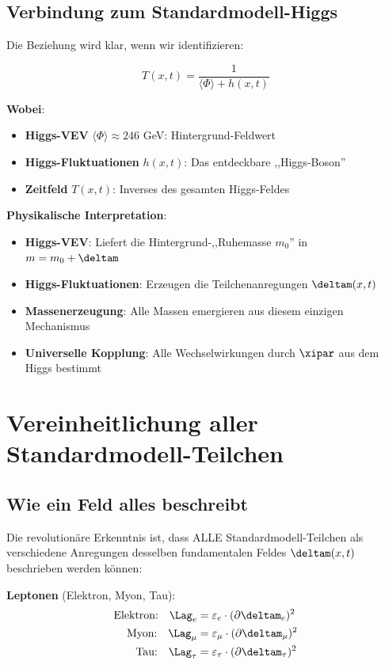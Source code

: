 	\subsection{Verbindung zum Standardmodell-Higgs}
	
	Die Beziehung wird klar, wenn wir identifizieren:
	
	\begin{equation}
		T(x,t) = \frac{1}{\langle\Phi\rangle + h(x,t)}
	\end{equation}
	
	\textbf{Wobei}:
	\begin{itemize}
		\item \textbf{Higgs-VEV} $\langle\Phi\rangle \approx 246$ GeV: Hintergrund-Feldwert
		\item \textbf{Higgs-Fluktuationen} $h(x,t)$: Das entdeckbare ,,Higgs-Boson''
		\item \textbf{Zeitfeld} $T(x,t)$: Inverses des gesamten Higgs-Feldes
	\end{itemize}
	
	\textbf{Physikalische Interpretation}:
	\begin{itemize}
		\item \textbf{Higgs-VEV}: Liefert die Hintergrund-,,Ruhemasse $m_0$'' in $m = m_0 + \deltam$
		\item \textbf{Higgs-Fluktuationen}: Erzeugen die Teilchenanregungen $\deltam(x,t)$
		\item \textbf{Massenerzeugung}: Alle Massen emergieren aus diesem einzigen Mechanismus
		\item \textbf{Universelle Kopplung}: Alle Wechselwirkungen durch $\xipar$ aus dem Higgs bestimmt
	\end{itemize}
	
	\section{Vereinheitlichung aller Standardmodell-Teilchen}
	
	\subsection{Wie ein Feld alles beschreibt}
	
	Die revolutionäre Erkenntnis ist, dass ALLE Standardmodell-Teilchen als verschiedene Anregungen desselben fundamentalen Feldes $\deltam(x,t)$ beschrieben werden können:
	
	\textbf{Leptonen} (Elektron, Myon, Tau):
	\begin{align}
		\text{Elektron:} \quad \Lag_e &= \varepsilon_e \cdot (\partial \deltam_e)^2 \\
		\text{Myon:} \quad \Lag_{\mu} &= \varepsilon_{\mu} \cdot (\partial \deltam_{\mu})^2 \\
		\text{Tau:} \quad \Lag_{\tau} &= \varepsilon_{\tau} \cdot (\partial \deltam_{\tau})^2
	\end{align}
	
